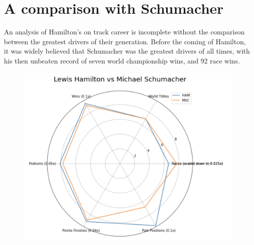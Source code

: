 \documentclass{article}
\begin{document}
\section{A comparison with Schumacher}
An analysis of Hamilton's on track career is incomplete without the comparison between the greatest drivers of their generation. Before the coming of Hamilton, it was widely believed that Schumacher was the greatest drivers of all times, with his then unbeaten record of seven world championship wins, and 92 race wins. 
\\
\begin{figure}[h]
\centering
\includegraphics[scale=0.4]{hammsc}
\caption{}
\label{fig:hammsc}
\end{figure}\\\\\\\\\\\
\end{document}
